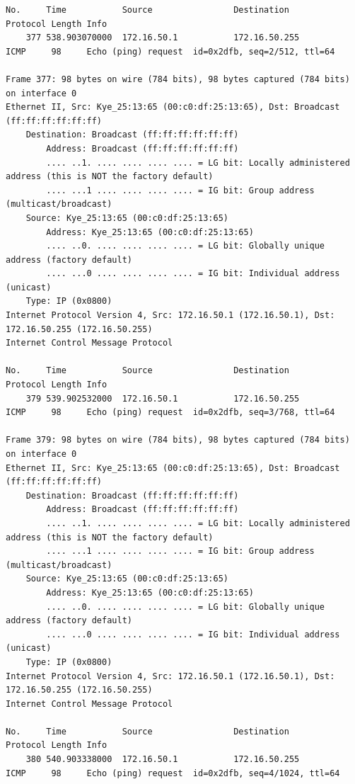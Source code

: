 \documentclass[a4paper,11pt]{article}
\begin{document}
\begin{lstlisting}
No.     Time           Source                Destination           Protocol Length Info
    377 538.903070000  172.16.50.1           172.16.50.255         ICMP     98     Echo (ping) request  id=0x2dfb, seq=2/512, ttl=64

Frame 377: 98 bytes on wire (784 bits), 98 bytes captured (784 bits) on interface 0
Ethernet II, Src: Kye_25:13:65 (00:c0:df:25:13:65), Dst: Broadcast (ff:ff:ff:ff:ff:ff)
    Destination: Broadcast (ff:ff:ff:ff:ff:ff)
        Address: Broadcast (ff:ff:ff:ff:ff:ff)
        .... ..1. .... .... .... .... = LG bit: Locally administered address (this is NOT the factory default)
        .... ...1 .... .... .... .... = IG bit: Group address (multicast/broadcast)
    Source: Kye_25:13:65 (00:c0:df:25:13:65)
        Address: Kye_25:13:65 (00:c0:df:25:13:65)
        .... ..0. .... .... .... .... = LG bit: Globally unique address (factory default)
        .... ...0 .... .... .... .... = IG bit: Individual address (unicast)
    Type: IP (0x0800)
Internet Protocol Version 4, Src: 172.16.50.1 (172.16.50.1), Dst: 172.16.50.255 (172.16.50.255)
Internet Control Message Protocol

No.     Time           Source                Destination           Protocol Length Info
    379 539.902532000  172.16.50.1           172.16.50.255         ICMP     98     Echo (ping) request  id=0x2dfb, seq=3/768, ttl=64

Frame 379: 98 bytes on wire (784 bits), 98 bytes captured (784 bits) on interface 0
Ethernet II, Src: Kye_25:13:65 (00:c0:df:25:13:65), Dst: Broadcast (ff:ff:ff:ff:ff:ff)
    Destination: Broadcast (ff:ff:ff:ff:ff:ff)
        Address: Broadcast (ff:ff:ff:ff:ff:ff)
        .... ..1. .... .... .... .... = LG bit: Locally administered address (this is NOT the factory default)
        .... ...1 .... .... .... .... = IG bit: Group address (multicast/broadcast)
    Source: Kye_25:13:65 (00:c0:df:25:13:65)
        Address: Kye_25:13:65 (00:c0:df:25:13:65)
        .... ..0. .... .... .... .... = LG bit: Globally unique address (factory default)
        .... ...0 .... .... .... .... = IG bit: Individual address (unicast)
    Type: IP (0x0800)
Internet Protocol Version 4, Src: 172.16.50.1 (172.16.50.1), Dst: 172.16.50.255 (172.16.50.255)
Internet Control Message Protocol

No.     Time           Source                Destination           Protocol Length Info
    380 540.903338000  172.16.50.1           172.16.50.255         ICMP     98     Echo (ping) request  id=0x2dfb, seq=4/1024, ttl=64


\end{lstlisting}
\end{document}
